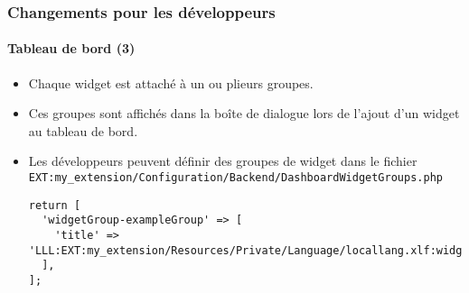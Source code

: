 \begin{frame}[fragile]
	\frametitle{Changements pour les développeurs}
	\framesubtitle{Tableau de bord (3)}

	\lstset{basicstyle=\tiny\ttfamily}

	\begin{itemize}
		\item Chaque widget est attaché à un ou plieurs groupes.
		\item Ces groupes sont affichés dans la boîte de dialogue lors de l'ajout
			d'un widget au tableau de bord.
		\item Les développeurs peuvent définir des groupes de widget dans le fichier\newline
			\smaller
				\texttt{EXT:my\_extension/Configuration/Backend/DashboardWidgetGroups.php}
			\normalsize

\vspace{-0.4cm}
\begin{lstlisting}
return [
  'widgetGroup-exampleGroup' => [
    'title' => 'LLL:EXT:my_extension/Resources/Private/Language/locallang.xlf:widget_group_name',
  ],
];
\end{lstlisting}

	\end{itemize}

\end{frame}


